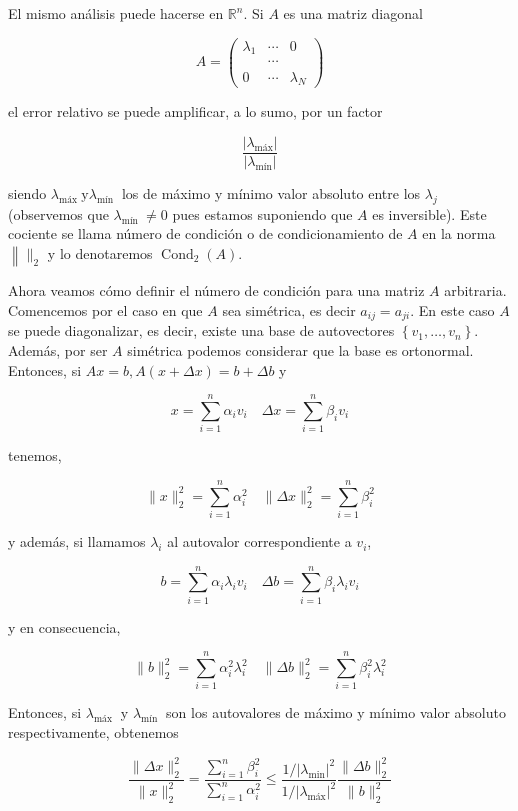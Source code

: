 \documentclass[10pt]{book}
\begin{document}
El mismo análisis puede hacerse en $\mathbb{R}^{n}$. Si $A$ es una matriz diagonal

$$
A=\left(\begin{array}{ccc}
\lambda_{1} & \cdots & 0 \\
& \cdots & \\
0 & \cdots & \lambda_{N}
\end{array}\right)
$$

el error relativo se puede amplificar, a lo sumo, por un factor

$$
\frac{\left|\lambda_{\operatorname{máx}}\right|}{\left|\lambda_{\operatorname{mín}}\right|}
$$

siendo $\lambda_{\text {máx }} \mathrm{y} \lambda_{\text {mín }}$ los de máximo y mínimo valor absoluto entre los $\lambda_{j}$ (observemos que $\lambda_{\text {mín }} \neq 0$ pues estamos suponiendo que $A$ es inversible). Este cociente se llama número de condición o de condicionamiento de $A$ en la norma $\left\|\|_{2}\right.$ y lo denotaremos $\operatorname{Cond}_{2}(A)$.

Ahora veamos cómo definir el número de condición para una matriz $A$ arbitraria. Comencemos por el caso en que $A$ sea simétrica, es decir $a_{i j}=a_{j i}$. En este caso $A$ se puede diagonalizar, es decir, existe una base de autovectores $\left\{v_{1}, \ldots, v_{n}\right\}$. Además, por ser $A$ simétrica podemos considerar que la base es ortonormal. Entonces, si $A x=b, A(x+\Delta x)=b+\Delta b$ y

$$
x=\sum_{i=1}^{n} \alpha_{i} v_{i} \quad \Delta x=\sum_{i=1}^{n} \beta_{i} v_{i}
$$

tenemos,

$$
\|x\|_{2}^{2}=\sum_{i=1}^{n} \alpha_{i}^{2} \quad\|\Delta x\|_{2}^{2}=\sum_{i=1}^{n} \beta_{i}^{2}
$$

y además, si llamamos $\lambda_{i}$ al autovalor correspondiente a $v_{i}$,

$$
b=\sum_{i=1}^{n} \alpha_{i} \lambda_{i} v_{i} \quad \Delta b=\sum_{i=1}^{n} \beta_{i} \lambda_{i} v_{i}
$$

y en consecuencia,

$$
\|b\|_{2}^{2}=\sum_{i=1}^{n} \alpha_{i}^{2} \lambda_{i}^{2} \quad\|\Delta b\|_{2}^{2}=\sum_{i=1}^{n} \beta_{i}^{2} \lambda_{i}^{2}
$$

Entonces, si $\lambda_{\text {máx }}$ y $\lambda_{\text {mín }}$ son los autovalores de máximo y mínimo valor absoluto respectivamente, obtenemos

$$
\frac{\|\Delta x\|_{2}^{2}}{\|x\|_{2}^{2}}=\frac{\sum_{i=1}^{n} \beta_{i}^{2}}{\sum_{i=1}^{n} \alpha_{i}^{2}} \leq \frac{1 /\left|\lambda_{\min }\right|^{2}}{1 /\left|\lambda_{\operatorname{máx}}\right|^{2}} \frac{\|\Delta b\|_{2}^{2}}{\|b\|_{2}^{2}}
$$
\end{document}
